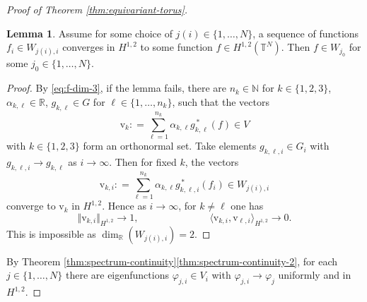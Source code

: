 \documentclass[12pt]{amsart}
\theoremstyle{definition}
\def\fnum{equation}
\newtheorem{lemma}[\fnum]{Lemma}
\numberwithin{equation}{section}
\newcommand{\vv}{\text{v}}
\newcommand{\sobo}{H^{1,2}}
\newcommand{\R}{\mathbb{R}}
\begin{document}
\begin{proof}[Proof of Theorem \ref{thm:equivariant-torus}]
\begin{lemma}\label{lem:w-ji-to-w-j}
    Assume for some choice of $j ( i ) \in \{ 1, \ldots , N \} $, a sequence of functions  $f_i \in W_{j(i), i}$  converges in $\sobo$ to some function $f \in \sobo (\mathbb{T}^N)$. Then $f \in W_{j_0}$ for some $j_0 \in \{ 1 , \ldots , N \}$. 
\end{lemma}

\begin{proof}
   By  \eqref{eq:f-dim-3}, if the lemma fails, there are $n_k\in \mathbb{N}$ for $k \in \{ 1, 2, 3 \}$, $\alpha _{k, \ell } \in \mathbb{R}$, $g_{k, \ell} \in G$ for $ \ell \in \{ 1, \ldots , n_k \}$, such that the vectors 
    \[    \vv _k : = \sum_{\ell = 1}^{n_k} \alpha_{k, \ell} g_{k,\ell }^{\, \ast}(f) \in V   \]
 with  $k \in \{ 1, 2, 3 \}$ form an orthonormal set. Take elements $g_{k,\ell, i } \in G_i$  with $g_{k, \ell , i } \to g_{k, \ell}$ as $i \to \infty$. Then for fixed $k$, the vectors
 \[     \vv_{k, i} : =  \sum_{\ell = 1}^{n_k} \alpha_{k, \ell} g_{k,\ell,i }^{\, \ast}(f_i) \in W_{j(i),i}                  \]
converge to $\vv_k$ in $\sobo$. Hence as $i \to \infty$, for $k \neq \ell$ one has
\[  \Vert \vv_{k,i} \Vert_{\sobo} \to 1  ,\hspace{3cm} \langle \vv_{k,i} , \vv_{\ell, i} \rangle_{\sobo} \to 0 .   \]
This is impossible as $\dim _{\R}(W_{j(i), i}) = 2$.
\end{proof}

By Theorem \ref{thm:spectrum-continuity}\eqref{thm:spectrum-continuity-2}, for each $j \in \{ 1, \ldots , N \} $ there are eigenfunctions $\varphi_{j,i} \in V_i$ with $\varphi_{j,i} \to \varphi_j$ uniformly and in $\sobo$. 


\end{proof}
\end{document}
